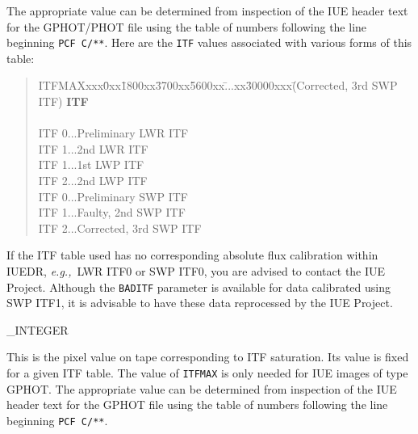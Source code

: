 {{   The appropriate value can be determined from inspection of the
   IUE header text for the GPHOT/PHOT file using the table
   of numbers following the line beginning \verb+PCF C/**+\@.
   Here are the \verb+ITF+ values associated with various forms of this
   table:

   \begin {quote}
   \begin {tabbing}
   ITFMAXxxx\= 0xx\= 1800xx\= 3700xx\= 5600xx\= ...xx\= 30000xxx\= (Corrected, 3rd SWP ITF)\kill
   {\bf ITF}\> \> \> \> \> \\
   \\
   ITF 0\>...\>Preliminary LWR ITF\\
   ITF 1\>...\>2nd LWR ITF\\
   ITF 1\>...\>1st LWP ITF\\
   ITF 2\>...\>2nd LWP ITF\\
   ITF 0\>...\>\>Preliminary SWP ITF\\
   ITF 1\>...\>Faulty, 2nd SWP ITF\\
   ITF 2\>...\>Corrected, 3rd SWP ITF\\
   \end {tabbing}
   \end {quote}

   If the ITF table used has no corresponding absolute flux calibration within
   IUEDR, {\it{e.g.,}}\ LWR ITF0 or SWP ITF0, you are advised to contact the IUE
   Project.
   Although the \verb+BADITF+ parameter is available for data calibrated using
   SWP ITF1, it is advisable to have these data reprocessed by the IUE Project.
}

{
   \_INTEGER
}{
   This is the pixel value on tape corresponding to ITF saturation.
   Its value is fixed for a given ITF table.
   The value of \verb+ITFMAX+ is only needed for IUE images of type GPHOT.
   The appropriate value can be determined from inspection of the
   IUE header text for the GPHOT file using the table
   of numbers following the line beginning \verb+PCF C/**+.

}}
